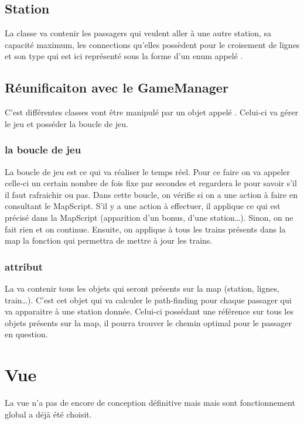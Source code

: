 \documentclass[report, backcover, french, nodocumentinfo]{upmethodology-document}
\begin{document}
			\subsection{Station}
				La classe  va contenir les passagers qui veulent aller à une autre station, sa capacité maximum, les connections qu'elles possèdent pour le croisement de lignes et son type qui est ici représenté sous la forme d'un enum appelé .
			\subsection{Réunificaiton avec le GameManager}
				C'est différentes classes vont être manipulé par un objet appelé . Celui-ci va gérer le jeu et posséder la boucle de jeu.
				\subsubsection{la boucle de jeu}
					La boucle de jeu est ce qui va réaliser le temps réel. Pour ce faire on va appeler celle-ci un certain nombre de fois fixe par secondes et regardera le  pour savoir s'il il faut rafraichir ou pas. Dans cette boucle, on vérifie si on a une action à faire en consultant le MapScript. S'il y a une action à effectuer, il applique ce qui est précisé dans la MapScript (apparition d'un bonus, d'une station\ldots). Sinon, on ne fait rien et on continue. Ensuite, on applique à tous les trains présents dans la map la fonction  qui permettra de mettre à jour les trains.
				\subsubsection{attribut}
					La  va contenir tous les objets qui seront présents sur la map (station, lignes, train\ldots). C'est cet objet qui va calculer le path-finding pour chaque passager qui va apparaitre à une station donnée. Celui-ci possédant une référence sur tous les objets présents sur la map, il pourra trouver le chemin optimal pour le passager en question.
		\section{Vue}
			La vue n'a pas de encore de conception définitive mais mais sont fonctionnement global a déjà été choisit.
\end{document}
